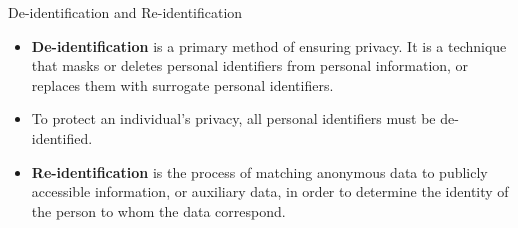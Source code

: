 \begin{vbframe}{De-identification and Re-identification}
\begin{itemize}
\item \textbf{De-identification} is a primary method of ensuring privacy. It is a technique that masks or deletes personal identifiers from personal information, or replaces them with surrogate personal identifiers.
\item To protect an individual's privacy, all personal identifiers must be de-identified.

\item \textbf{Re-identification} is the process of matching anonymous data to publicly accessible information, or auxiliary data, in order to determine the identity of the person to whom the data correspond.

\end{itemize}
\framebreak


\end{vbframe}
